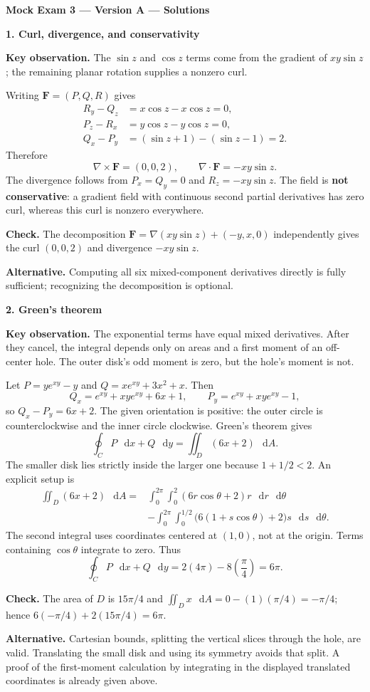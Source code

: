 \documentclass[11pt,letterpaper]{article}
\newcommand{\curl}{\nabla\times}
\newcommand{\dv}{\nabla\cdot}
\renewcommand{\vec}[1]{\mathbf{#1}}
\newcommand{\dd}{\mathop{}\!\mathrm{d}}
\newcommand{\solutionproblem}[3]{%
  \par\bigskip\Needspace{7\baselineskip}
  \noindent\textbf{#1. #2}\par\nobreak
}
\newcommand{\insight}[1]{\par\textbf{Key observation.} #1\par}
\newcommand{\verification}[1]{\par\textbf{Check.} #1\par}
\newcommand{\alternative}[1]{\par\textbf{Alternative.} #1\par}
\begin{document}
{\large\bfseries Mock Exam 3 --- Version A --- Solutions}
\smallskip
\solutionproblem{1}{Curl, divergence, and conservativity}{10}
\insight{The $\sin z$ and $\cos z$ terms come from the gradient of
$xy\sin z$; the remaining planar rotation supplies a nonzero curl.}
Writing $\vec F=(P,Q,R)$ gives
\[
\begin{aligned}
R_y-Q_z&=x\cos z-x\cos z=0,\\
P_z-R_x&=y\cos z-y\cos z=0,\\
Q_x-P_y&=(\sin z+1)-(\sin z-1)=2.
\end{aligned}
\]
Therefore
\[
\boxed{\curl\vec F=(0,0,2)},\qquad
\boxed{\dv\vec F=-xy\sin z}.
\]
The divergence follows from $P_x=Q_y=0$ and $R_z=-xy\sin z$.
The field is \textbf{not conservative}: a gradient field with continuous
second partial derivatives has zero curl, whereas this curl is nonzero
everywhere.
\verification{The decomposition
$\vec F=\nabla(xy\sin z)+(-y,x,0)$ independently gives the curl
$(0,0,2)$ and divergence $-xy\sin z$.}
\alternative{Computing all six mixed-component derivatives directly is
fully sufficient; recognizing the decomposition is optional.}

\solutionproblem{2}{Green's theorem}{12}
\insight{The exponential terms have equal mixed derivatives. After
they cancel, the integral depends only on areas and a first moment of
an off-center hole. The outer disk's odd moment is zero, but the hole's
moment is not.}
Let $P=ye^{xy}-y$ and $Q=xe^{xy}+3x^2+x$. Then
\[
Q_x=e^{xy}+xye^{xy}+6x+1,\qquad
P_y=e^{xy}+xye^{xy}-1,
\]
so $Q_x-P_y=6x+2$. The given orientation is positive: the outer circle
is counterclockwise and the inner circle clockwise. Green's theorem gives
\[
\oint_C P\,\dd x+Q\,\dd y=\iint_D(6x+2)\,\dd A.
\]
The smaller disk lies strictly inside the larger one because
$1+1/2<2$. An explicit setup is
\[
\begin{aligned}
\iint_D(6x+2)\,\dd A
={}&\int_0^{2\pi}\int_0^2(6r\cos\theta+2)r\,\dd r\,\dd\theta\\
&-\int_0^{2\pi}\int_0^{1/2}
\bigl(6(1+s\cos\theta)+2\bigr)s\,\dd s\,\dd\theta.
\end{aligned}
\]
The second integral uses coordinates centered at $(1,0)$, not at the
origin. Terms containing $\cos\theta$ integrate to zero. Thus
\[
\oint_C P\,\dd x+Q\,\dd y
=2(4\pi)-8\left(\frac\pi4\right)
=\boxed{6\pi}.
\]
\verification{The area of $D$ is $15\pi/4$ and
$\iint_D x\,\dd A=0-(1)(\pi/4)=-\pi/4$; hence
$6(-\pi/4)+2(15\pi/4)=6\pi$.}
\alternative{Cartesian bounds, splitting the vertical slices through
the hole, are valid. Translating the small disk and using its symmetry
avoids that split. A proof of the first-moment calculation by integrating
in the displayed translated coordinates is already given above.}
\end{document}
